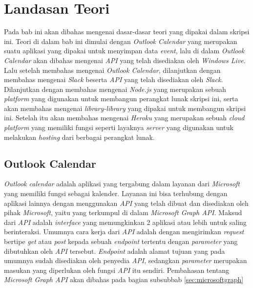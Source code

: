 \chapter{Landasan Teori}
\label{chap:teori}

Pada bab ini akan dibahas mengenai dasar-dasar teori yang dipakai dalam skripsi ini. Teori di dalam bab ini dimulai dengan \textit{Outlook Calendar} yang merupakan suatu aplikasi yang dipakai untuk menyimpan data \textit{event}, lalu di dalam \textit{Outlook Calendar} akan dibahas mengenai \textit{API} yang telah disediakan oleh \textit{Windows Live}. Lalu setelah membahas mengenai \textit{Outlook Calendar}, dilanjutkan dengan membahas mengenai \textit{Slack} beserta \textit{API} yang telah disediakan oleh \textit{Slack}. Dilanjutkan dengan membahas mengenai \textit{Node.js} yang merupakan sebuah \textit{platform} yang digunakan untuk membangun perangkat lunak skripsi ini, serta akan membahas mengenai \textit{library-library} yang dipakai untuk membangun skripsi ini. Setelah itu akan membahas mengenai \textit{Heroku} yang merupakan sebuah \textit{cloud platform} yang memiliki fungsi seperti layaknya \textit{server} yang digunakan untuk melakukan \textit{hosting} dari berbagai perangkat lunak. 

\section{Outlook Calendar}
\textit{Outlook calendar} adalah aplikasi yang tergabung dalam layanan dari \textit{Microsoft} yang memiliki fungsi sebagai kalender. Layanan ini bisa terhubung dengan aplikasi lainnya dengan menggunakan \textit{API} yang telah dibuat dan disediakan oleh pihak \textit{Microsoft}, yaitu yang terkumpul di dalam \textit{Microsoft Graph API}. Maksud dari \textit{API} adalah \textit{interface} yang memungkinkan 2 aplikasi atau lebih untuk saling berinteraksi. Umumnya cara kerja dari \textit{API} adalah dengan mengirimkan \textit{request} bertipe \textit{get} atau \textit{post} kepada sebuah \textit{endpoint} tertentu dengan \textit{parameter} yang dibutuhkan oleh \textit{API} tersebut. \textit{Endpoint} adalah alamat tujuan yang pada umumnya sudah disediakan oleh penyedia \textit{API}, sedangkan \textit{parameter} merupakan masukan yang diperlukan oleh fungsi \textit{API} itu sendiri. Pembahasan tentang \textit{Microsoft Graph API} akan dibahas pada bagian subsubbab \ref{sec:microsoftgraph} 

